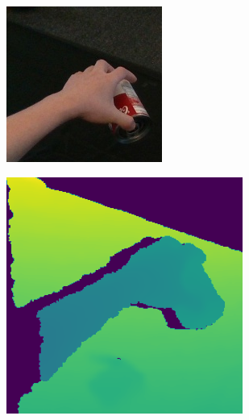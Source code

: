 \begin{figure}[h!]
    \begin{subfigure}[b]{0.16\linewidth}
    \includegraphics[width=0.98\linewidth]{figs/9063_rgb}
  \end{subfigure}
  \begin{subfigure}[b]{0.16\linewidth}
    \includegraphics[width=0.98\linewidth]{figs/9063_depth2}

\end{subfigure}
\end{figure}
